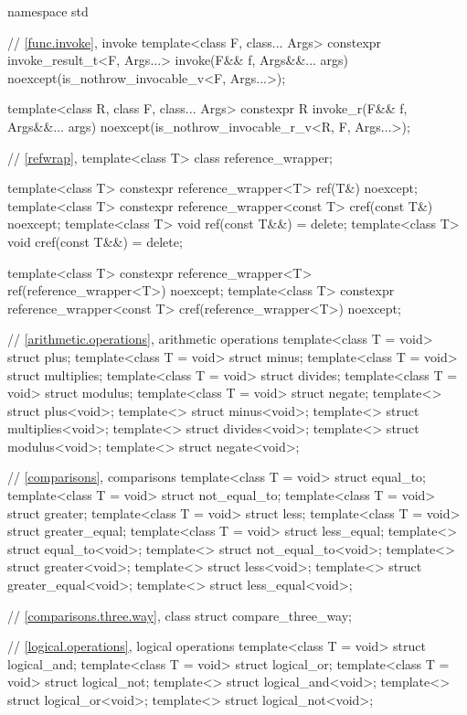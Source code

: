 %
%
%
\begin{codeblock}
namespace std {
  // \ref{func.invoke}, invoke
  template<class F, class... Args>
    constexpr invoke_result_t<F, Args...> invoke(F&& f, Args&&... args)
      noexcept(is_nothrow_invocable_v<F, Args...>);

  template<class R, class F, class... Args>
    constexpr R invoke_r(F&& f, Args&&... args)
      noexcept(is_nothrow_invocable_r_v<R, F, Args...>);

  // \ref{refwrap}, 
  template<class T> class reference_wrapper;

  template<class T> constexpr reference_wrapper<T> ref(T&) noexcept;
  template<class T> constexpr reference_wrapper<const T> cref(const T&) noexcept;
  template<class T> void ref(const T&&) = delete;
  template<class T> void cref(const T&&) = delete;

  template<class T> constexpr reference_wrapper<T> ref(reference_wrapper<T>) noexcept;
  template<class T> constexpr reference_wrapper<const T> cref(reference_wrapper<T>) noexcept;

  // \ref{arithmetic.operations}, arithmetic operations
  template<class T = void> struct plus;
  template<class T = void> struct minus;
  template<class T = void> struct multiplies;
  template<class T = void> struct divides;
  template<class T = void> struct modulus;
  template<class T = void> struct negate;
  template<> struct plus<void>;
  template<> struct minus<void>;
  template<> struct multiplies<void>;
  template<> struct divides<void>;
  template<> struct modulus<void>;
  template<> struct negate<void>;

  // \ref{comparisons}, comparisons
  template<class T = void> struct equal_to;
  template<class T = void> struct not_equal_to;
  template<class T = void> struct greater;
  template<class T = void> struct less;
  template<class T = void> struct greater_equal;
  template<class T = void> struct less_equal;
  template<> struct equal_to<void>;
  template<> struct not_equal_to<void>;
  template<> struct greater<void>;
  template<> struct less<void>;
  template<> struct greater_equal<void>;
  template<> struct less_equal<void>;

  // \ref{comparisons.three.way}, class 
  struct compare_three_way;

  // \ref{logical.operations}, logical operations
  template<class T = void> struct logical_and;
  template<class T = void> struct logical_or;
  template<class T = void> struct logical_not;
  template<> struct logical_and<void>;
  template<> struct logical_or<void>;
  template<> struct logical_not<void>;

}
\end{codeblock}
